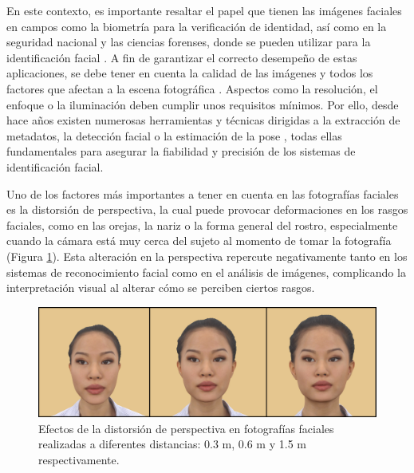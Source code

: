 En este contexto, es importante resaltar el papel que tienen las imágenes faciales en campos como la biometría para la verificación de identidad, así como en la seguridad nacional y las ciencias forenses, donde se pueden utilizar para la identificación facial \cite{80, 81, 82}. A fin de garantizar el correcto desempeño de estas aplicaciones, se debe tener en cuenta la calidad de las imágenes y todos los factores que afectan a la escena fotográfica \cite{86,87}. Aspectos como la resolución, el enfoque o la iluminación deben cumplir unos requisitos mínimos. Por ello, desde hace años existen numerosas herramientas y técnicas dirigidas a la extracción de metadatos, la detección facial \cite{83, 84} o la estimación de la pose \cite{56, 85}, todas ellas fundamentales para asegurar la fiabilidad y precisión de los sistemas de identificación facial.


Uno de los factores más importantes a tener en cuenta en las fotografías faciales es la distorsión de perspectiva, la cual puede provocar deformaciones en los rasgos faciales, como en las orejas, la nariz o la forma general del rostro, especialmente cuando la cámara está muy cerca del sujeto al momento de tomar la fotografía \cite{12} (Figura \ref{fig2}). 
Esta alteración en la perspectiva repercute negativamente tanto en los sistemas de reconocimiento facial como en el análisis de imágenes, complicando la interpretación visual al alterar cómo se perciben ciertos rasgos.

\begin{figure}[h]
	\centering
	\includegraphics[scale=0.25]{imagenes/cap1/scd_distorsion.png}
	\caption[Efectos de la distorsión de perspectiva en fotografías faciales.]{Efectos de la distorsión de perspectiva en fotografías faciales realizadas a diferentes distancias: 0.3 m, 0.6 m y 1.5 m respectivamente.}
	\label{fig2}
\end{figure}

